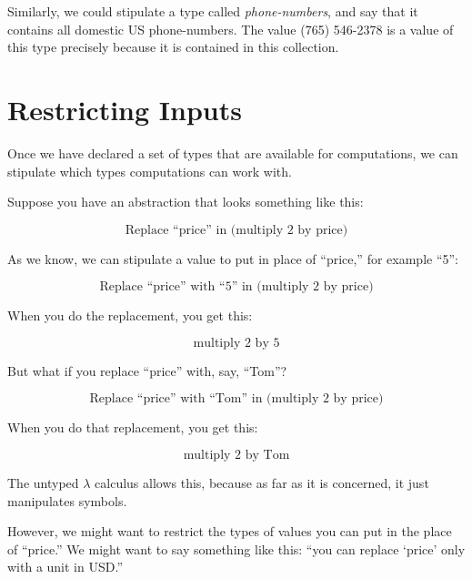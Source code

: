 \documentclass{book}
\numberwithin{equation}{chapter}
\begin{document}
Similarly, we could stipulate a type called \textit{phone-numbers}, and say that it contains all domestic US phone-numbers. The value (765) 546-2378 is a value of this type precisely because it is contained in this collection.


\section{Restricting Inputs}

Once we have declared a set of types that are available for computations, we can stipulate which types computations can work with.

Suppose you have an abstraction that looks something like this:

\begin{equation}
\text{Replace ``price'' in (multiply 2 by price)}
\end{equation}

\noindent
As we know, we can stipulate a value to put in place of ``price,'' for example ``5'':

\begin{equation}
\text{Replace ``price'' with ``5'' in (multiply 2 by price)}
\end{equation}

\noindent
When you do the replacement, you get this:

\begin{equation}
\text{multiply 2 by 5}
\end{equation}

\noindent
But what if you replace ``price'' with, say, ``Tom''?

\begin{equation}
\text{Replace ``price'' with ``Tom'' in (multiply 2 by price)}
\end{equation}

\noindent
When you do that replacement, you get this:

\begin{equation}
\text{multiply 2 by Tom}
\end{equation}

\noindent
The untyped $\lambda$ calculus allows this, because as far as it is concerned, it just manipulates symbols.

However, we might want to restrict the types of values you can put in the place of ``price.'' We might want to say something like this: ``you can replace `price' only with a unit in USD.'' 
\end{document}
